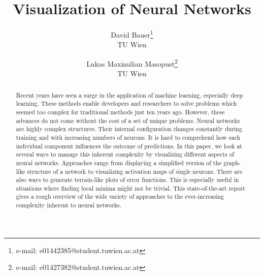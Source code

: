 \documentclass{acmsiggraph}               %
\title{Visualization of Neural Networks}
\author{David Bauer\thanks{e-mail: e01442385@student.tuwien.ac.at}\\ TU Wien %
\and Lukas Maximilian Masopust\thanks{e-mail: e01427382@student.tuwien.ac.at}\\ TU Wien %
}
\begin{document}




\maketitle



\begin{abstract}
Recent years have seen a surge in the application of machine learning, especially deep learning. These methods enable developers and researchers to solve problems which seemed too complex for traditional methods just ten years ago. However, these advances do not come without the cost of a set of unique problems. Neural networks are highly complex structures. Their internal configuration changes constantly during training and with increasing numbers of neurons. It is hard to comprehend how each individual component influences the outcome of predictions.
In this paper, we look at several ways to manage this inherent complexity by visualizing different aspects of neural networks. Approaches range from displaying a simplified version of the graph-like structure of a network to visualizing activation maps of single neurons. There are also ways to generate terrain-like plots of error functions. This is especially useful in situations where finding local minima might not be trivial.
This state-of-the-art report gives a rough overview of the wide variety of approaches to the ever-increasing complexity inherent to neural networks.
\end{abstract}
\end{document}

